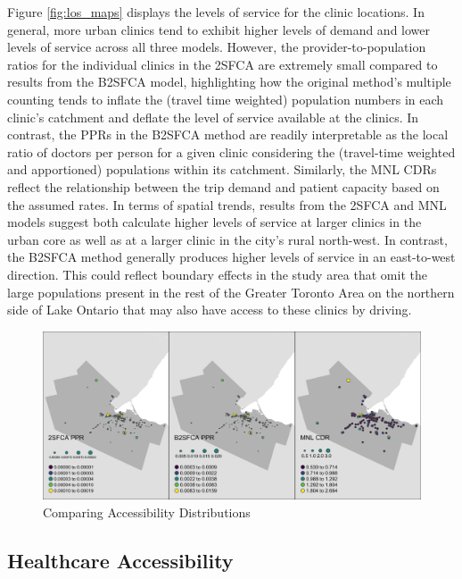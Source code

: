 \documentclass{article}
\begin{document}
Figure \ref{fig:los_maps} displays the levels of service for the clinic
locations. In general, more urban clinics tend to exhibit higher levels
of demand and lower levels of service across all three models. However,
the provider-to-population ratios for the individual clinics in the
2SFCA are extremely small compared to results from the B2SFCA model,
highlighting how the original method's multiple counting tends to
inflate the (travel time weighted) population numbers in each clinic's
catchment and deflate the level of service available at the clinics. In
contrast, the PPRs in the B2SFCA method are readily interpretable as the
local ratio of doctors per person for a given clinic considering the
(travel-time weighted and apportioned) populations within its catchment.
Similarly, the MNL CDRs reflect the relationship between the trip demand
and patient capacity based on the assumed rates. In terms of spatial
trends, results from the 2SFCA and MNL models suggest both calculate
higher levels of service at larger clinics in the urban core as well as
at a larger clinic in the city's rural north-west. In contrast, the
B2SFCA method generally produces higher levels of service in an
east-to-west direction. This could reflect boundary effects in the study
area that omit the large populations present in the rest of the Greater
Toronto Area on the northern side of Lake Ontario that may also have
access to these clinics by driving.

\begin{figure}
\includegraphics[width=1\linewidth]{./img/los_maps} \caption{\label{fig:los_maps}Comparing Accessibility Distributions}\label{fig:los_maps_fig}
\end{figure}

\hypertarget{healthcare-accessibility}{%
\subsection{Healthcare Accessibility}\label{healthcare-accessibility}}
\end{document}
